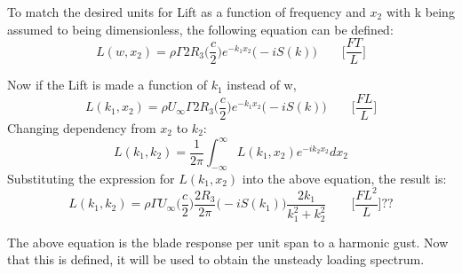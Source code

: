 \documentclass{article}
\begin{document}
\noindent To match the desired units for Lift as a function of frequency and $x_2$ with k being assumed to being dimensionless, the following equation can be defined: 
\begin{equation}
L(w,x_2) = \rho \Gamma 2R_3 \Big(\frac{c}{2}\Big) e^{-k_1x_2} \Big(-i S(k) \Big) \qquad  \Bigg[\frac{FT}{L}\Bigg]
\end{equation}

\noindent Now if the Lift is made a function of $k_1$ instead of w, 
\begin{equation}
L(k_1,x_2) = \rho U_{\infty} \Gamma 2R_3 \Big(\frac{c}{2}\Big) e^{-k_1x_2} \Big(-i S(k) \Big) \qquad \Bigg[\frac{FL}{L} \Bigg]
\end{equation}
Changing dependency from $x_2$ to $k_2$:
\begin{equation}
L(k_1,k_2) = \frac{1}{2\pi} \int_{-\infty}^{\infty} L(k_1,x_2) e^{-ik_2x_2}dx_2
\end{equation}
Substituting the expression for $L(k_1,x_2)$ into the above equation, the result is:
\begin{equation}
L(k_1,k_2) = \rho \Gamma U_\infty \Big(\frac{c}{2} \Big) \frac{2R_3}{2\pi} \Big(-iS(k_1)\Big) \frac{2k_1}{k_1^2 +k_2^2} \qquad \Bigg[\frac{FL^2}{L}\Bigg]  ??
\end{equation}

The above equation is the blade response per unit span to a harmonic gust. Now that this is defined, it will be used to obtain the unsteady loading spectrum. 
\end{document}
